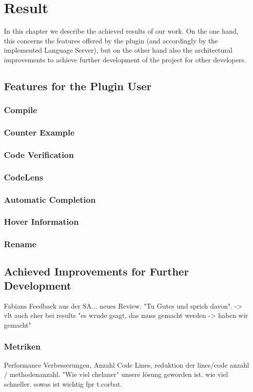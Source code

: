 \section{Result}
In this chapter we describe the achieved results of our work.
On the one hand, this concerns the features offered by the plugin
(and accordingly by the implemented Language Server),
but on the other hand also the architectural improvements to achieve further development of the project for other developers.

\subsection{Features for the Plugin User}

\subsubsection{Compile}
\subsubsection{Counter Example}
\subsubsection{Code Verification}
\subsubsection{CodeLens}
\subsubsection{Automatic Completion}
\subsubsection{Hover Information}
\subsubsection{Rename}

\subsection{Achieved Improvements for Further Development}
Fabians Feedback aus der SA... neues Review. "Tu Gutes und sprich davon". -> vlt auch eher bei results "es wrude gsagt, das muss gemacht werden -> haben wir gemacht"

\subsubsection{Metriken}
Performance Verbesserungen, Anzahl Code Lines, reduktion der lines/code anzahl / methodenanzahl.
"Wie viel chelaner" unsere lösung geworden ist. wie viel schneller. sowas ist wichtig fpr t.corbat. 

